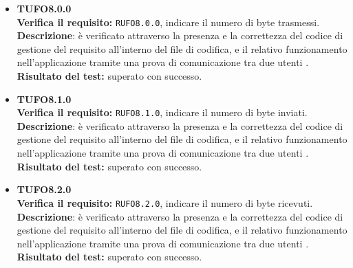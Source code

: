 \begin{itemize}
\item \textbf{TUFO8.0.0}\\
\textbf{Verifica il requisito:} \texttt{RUFO8.0.0}, indicare il numero di byte trasmessi.\\
\textbf{Descrizione}: è verificato attraverso la presenza e la correttezza del codice di gestione del requisito all'interno del file di codifica, e il relativo funzionamento nell'applicazione tramite una prova di comunicazione tra due utenti .\\
\textbf{Risultato del test:} superato con successo.

\item \textbf{TUFO8.1.0}\\
\textbf{Verifica il requisito:} \texttt{RUFO8.1.0}, indicare il numero di byte inviati.\\
\textbf{Descrizione}: è verificato attraverso la presenza e la correttezza del codice di gestione del requisito all'interno del file di codifica, e il relativo funzionamento nell'applicazione tramite una prova di comunicazione tra due utenti .\\
\textbf{Risultato del test:} superato con successo.

\item \textbf{TUFO8.2.0}\\
\textbf{Verifica il requisito:} \texttt{RUFO8.2.0}, indicare il numero di byte ricevuti.\\
\textbf{Descrizione}: è verificato attraverso la presenza e la correttezza del codice di gestione del requisito all'interno del file di codifica, e il relativo funzionamento nell'applicazione tramite una prova di comunicazione tra due utenti .\\
\textbf{Risultato del test:} superato con successo.




\end{itemize}

